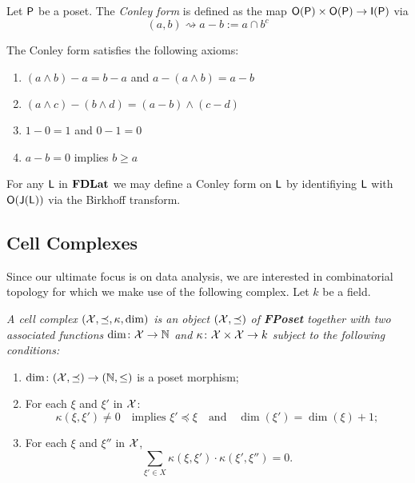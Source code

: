 Let ${\mathsf P}$ be a poset.  The {\em Conley form} is defined as the map ${\mathsf O}({\mathsf P})\times {\mathsf O}({\mathsf P})\to {\mathsf I}({\mathsf P})$ via 
\[
(a,b)\rightsquigarrow a-b:=a\cap b^c
\]

The Conley form satisfies the following axioms:

\begin{enumerate}
\item $(a\wedge b)-a = b-a$ and $a - (a\wedge b) = a-b$
\item $(a\wedge c)-(b\wedge d) = (a-b)\wedge (c-d)$
\item $1-0 = 1$ and $0-1 = 0$
\item $a-b = 0$ implies $b\geq a$
\end{enumerate}

For any ${\mathsf L}$ in ${\bf FDLat}$ we may define a Conley form on ${\mathsf L}$ by identifiying ${\mathsf L}$ with ${\mathsf O}({\mathsf J}({\mathsf L}))$ via the Birkhoff transform.


\subsection{Cell Complexes}

Since our ultimate focus is on data analysis, we are interested in combinatorial topology for which we make use of the following complex.  Let $k$ be a field.

\begin{defn}
\label{defn:cellComplex}
{\em
A {\em cell complex} $({\mathcal X},\preceq,\kappa,\dim)$ is an object $({\mathcal X},\preceq)$ of {\bf FPoset} together with two associated functions $\dim\colon {\mathcal X}\to {\mathbb{N}}$ and $\kappa\colon {\mathcal X}\times {\mathcal X}\to k$ subject to the following conditions:
\begin{enumerate}
\item $\dim\colon({\mathcal X},\preceq)\to ({\mathbb{N}},\leq)$ is a poset morphism;
\item  For each $\xi$ and $\xi'$ in ${\mathcal X}$:
\[
\kappa(\xi,\xi')\neq 0\quad\text{implies } \xi'\preceq \xi \quad\text{and}\quad \dim(\xi') = \dim(\xi)+1;
\]
\item\label{cond:three} For each $\xi$ and $\xi''$ in ${\mathcal X}$,
\[
\sum_{\xi'\in X} \kappa(\xi,\xi')\cdot \kappa(\xi',\xi'')=0.
\]
\end{enumerate}
}
\end{defn}

